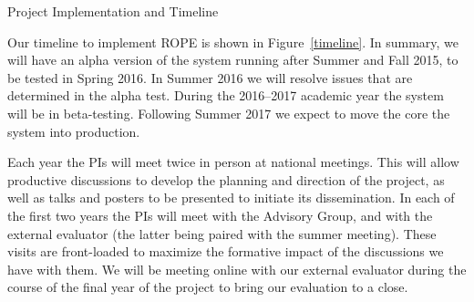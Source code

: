 \documentclass[11pt]{article}
\begin{document}
\begin{section}{Project Implementation and Timeline}

Our timeline to implement ROPE is shown in Figure~\ref{timeline}.  In
summary, we will have an alpha version of the system running after Summer
and Fall 2015, to be tested in Spring 2016.  In Summer 2016 we will
resolve issues that are determined in the alpha test.  During the
2016--2017 academic year the system will be in beta-testing.  Following
Summer 2017 we expect to move the core the system into production.

Each year the PIs will meet twice in person at national meetings.  This
will allow productive discussions to develop the planning and
direction of the project, as well as talks and posters to be presented to
initiate its dissemination.  In each of the first two years the PIs will meet with the
Advisory Group, and with the external evaluator (the latter being paired
with the summer meeting).  These visits are front-loaded to maximize the
formative impact of the discussions we have with them.  We
will be meeting online with our external evaluator during the course of the
final year of the project to bring our evaluation to a close.


\end{section}
\end{document}
